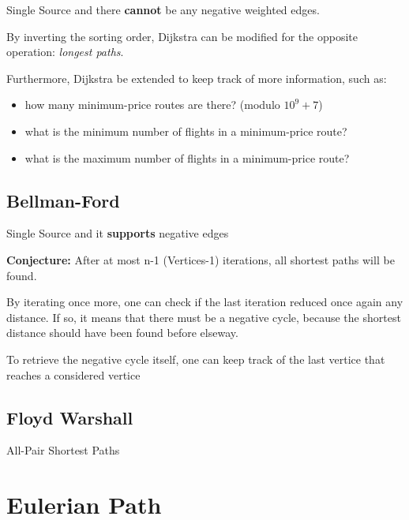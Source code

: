 		Single Source and there \textbf{cannot} be any negative weighted edges. 


		By inverting the sorting order, Dijkstra can be modified for the opposite operation: \textit{longest paths}.

		Furthermore, Dijkstra be extended to keep track of more information, such as:

		\begin{itemize}
			\item how many minimum-price routes are there? (modulo $10^9+7$)
			\item what is the minimum number of flights in a minimum-price route?
			\item what is the maximum number of flights in a minimum-price route?
		\end{itemize}


	\subsection{Bellman-Ford}

		Single Source and it \textbf{supports} negative edges

		\textbf{Conjecture:} After at most n-1 (Vertices-1) iterations, all shortest paths will be found.
		

		By iterating once more, one can check if the last iteration reduced once again any distance. If so, it means that
		there must be a negative cycle, because the shortest distance should have been found before elseway.
		
		To retrieve the negative cycle itself, one can keep track of the last vertice that reaches a considered vertice

	
	\vspace{7pts}

	\subsection{Floyd Warshall}

	All-Pair Shortest Paths


\section{Eulerian Path}


